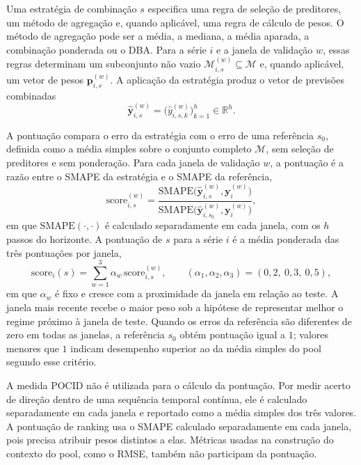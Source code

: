 Uma estratégia de combinação $s$ especifica uma regra de seleção de preditores, um método de agregação e, quando aplicável, uma regra de cálculo de pesos. O método de agregação pode ser a média, a mediana, a média aparada, a combinação ponderada ou o DBA. Para a série $i$ e a janela de validação $w$, essas regras determinam um subconjunto não vazio $\mathcal{M}_{i,s}^{(w)} \subseteq \mathcal{M}$ e, quando aplicável, um vetor de pesos $\mathbf{p}_{i,s}^{(w)}$. A aplicação da estratégia produz o vetor de previsões combinadas
\[
    \hat{\mathbf{y}}_{i,s}^{(w)}
    =
    \bigl(\hat{y}_{i,s,k}^{(w)}\bigr)_{k=1}^{h}
    \in \mathbb{R}^{h}.
\]

A pontuação compara o erro da estratégia com o erro de uma referência $s_0$, definida como a média simples sobre o conjunto completo $\mathcal{M}$, sem seleção de preditores e sem ponderação. Para cada janela de validação $w$, a pontuação é a razão entre o SMAPE da estratégia e o SMAPE da referência,
\[
    \text{score}_{i,s}^{(w)}
    =
    \frac{
        \text{SMAPE}\bigl(\hat{\mathbf{y}}_{i,s}^{(w)}, \mathbf{y}_i^{(w)}\bigr)
    }{
        \text{SMAPE}\bigl(\hat{\mathbf{y}}_{i,s_0}^{(w)}, \mathbf{y}_i^{(w)}\bigr)
    },
\]
em que $\text{SMAPE}(\cdot,\cdot)$ é calculado separadamente em cada janela, com os $h$ passos do horizonte. A pontuação de $s$ para a série $i$ é a média ponderada das três pontuações por janela,
\begin{equation}
    \text{score}_i(s)
    =
    \sum_{w=1}^{3} \alpha_w \, \text{score}_{i,s}^{(w)},
    \qquad
    (\alpha_1, \alpha_2, \alpha_3) = (0{,}2,\ 0{,}3,\ 0{,}5),
    \label{eq:score}
\end{equation}
em que $\alpha_w$ é fixo e cresce com a proximidade da janela em relação ao teste. A janela mais recente recebe o maior peso sob a hipótese de representar melhor o regime próximo à janela de teste. Quando os erros da referência são diferentes de zero em todas as janelas, a referência $s_0$ obtém pontuação igual a $1$; valores menores que $1$ indicam desempenho superior ao da média simples do pool segundo esse critério.

A medida POCID não é utilizada para o cálculo da pontuação. Por medir acerto de direção dentro de uma sequência temporal contínua, ele é calculado separadamente em cada janela e reportado como a média simples dos três valores. A pontuação de ranking usa o SMAPE calculado separadamente em cada janela, pois precisa atribuir pesos distintos a elas. Métricas usadas na construção do contexto do pool, como o RMSE, também não participam da pontuação.

